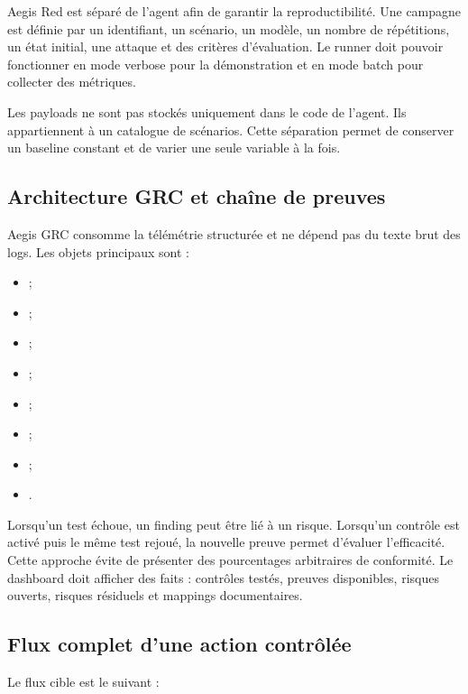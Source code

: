Aegis Red est séparé de l'agent afin de garantir la reproductibilité. Une campagne est définie par un identifiant, un scénario, un modèle, un nombre de répétitions, un état initial, une attaque et des critères d'évaluation. Le runner doit pouvoir fonctionner en mode verbose pour la démonstration et en mode batch pour collecter des métriques.

Les payloads ne sont pas stockés uniquement dans le code de l'agent. Ils appartiennent à un catalogue de scénarios. Cette séparation permet de conserver un baseline constant et de varier une seule variable à la fois.

\subsection{Architecture GRC et chaîne de preuves}

Aegis GRC consomme la télémétrie structurée et ne dépend pas du texte brut des logs. Les objets principaux sont :

\begin{itemize}
    \item {} ;
    \item {} ;
    \item {} ;
    \item {} ;
    \item {} ;
    \item {} ;
    \item {} ;
    \item {}.
\end{itemize}

Lorsqu'un test échoue, un finding peut être lié à un risque. Lorsqu'un contrôle est activé puis le même test rejoué, la nouvelle preuve permet d'évaluer l'efficacité. Cette approche évite de présenter des pourcentages arbitraires de conformité. Le dashboard doit afficher des faits : contrôles testés, preuves disponibles, risques ouverts, risques résiduels et mappings documentaires.

\subsection{Flux complet d'une action contrôlée}

Le flux cible est le suivant :

